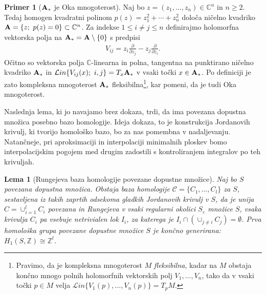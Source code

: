 \documentclass[12pt,a4paper,twoside]{article}
\theoremstyle{definition} %
\newtheorem{primer}[definicija]{Primer}
\theoremstyle{plain} %
\newtheorem{lema}[definicija]{Lema}
\numberwithin{equation}{section}  %
\begin{document}
\begin{primer} [$\textbf{\textup{A}}_{*}$ je Oka mnogoterost] \label{primer-oka}
Naj bo $z = (z_{1}, \dots , z_{n}) \in \mathbb{C}^{n}$ in $n \geq 2$. Tedaj  homogen kvadratni polinom $p(z) = z_{1}^{2} + \cdots + z_{n}^{2}$ določa ničelno kvadriko $\textbf{\textup{A}} = \{z ; \ p(z)=0 \} \subset \mathbb{C}^{n}$.
Za indekse $1 \leq i \neq j \leq n$ definirajmo holomorfna vektorska polja na $ \textbf{\textup{A}}_{*} = \textbf{\textup{A}} \setminus \{ 0 \}$ s predpisi
\begin{gather*}
V_{ij} = z_{i} \frac{\partial}{\partial z_{j}} - z_{j} \frac{\partial}{\partial z_{i}}.
\end{gather*}
Očitno so vektorska polja $\mathbb{C}$-linearna in polna, tangentna na punktirano ničelno kvadriko $\textbf{\textup{A}}_{*}$ in $\mathcal{L}in \{ V_{ij}(x) ; \ i,j \} = T_{x}\textbf{\textup{A}}_{*}$ v vsaki točki $x \in \textbf{\textup{A}}_{*}$. Po definiciji je zato kompleksna mnogoterost $\textbf{\textup{A}}_{*}$ fleksibilna\footnote{Pravimo, da je kompleksna mnogoterost $M$ \emph{fleksibilna}, kadar na $M$ obstaja končno mnogo polnih holomorfnih vektorskih polj $V_{1}, \dots , V_{n}$, tako da v vsaki točki $p \in M$ velja $\mathcal{L}in \{ V_{1}(p), \dots , V_{n}(p) \} = T_{p}M$.}, 
kar pomeni, da je tudi Oka mnogoterost.
\end{primer}

Naslednja lema, ki jo navajamo brez dokaza, trdi, da ima povezana dopustna množica posebno bazo homologije. Ideja dokaza, to je konstrukcija Jordanovih krivulj, ki tvorijo homološko bazo, bo za nas pomembna v nadaljevanju. Natančneje, pri aproksimaciji in interpolaciji minimalnih ploskev bomo interpolacijskim pogojem med drugim zadostili s kontroliranjem integralov po teh krivuljah.

\begin{lema} [Rungejeva baza homologije povezane dopustne množice] \label{lema:Runge-hom-baza}
Naj bo $S$ povezana dopustna množica. Obstaja baza homologije $\mathcal{C} = \{ C_{1}, \dots , C_{l} \}$ za $S$, sestavljena iz takih zaprtih odsekoma gladkih Jordanovih krivulj v $S$, da je unija $C = \cup_{i=1}^{l} C_{i}$ povezana in Rungejeva v vsaki regularni okolici $S_{\varepsilon}$ množice $S$, vsaka krivulja $C_{i}$ pa vsebuje netrivialen lok $I_{i}$, za katerega je $I_{i} \cap (\cup_{j \neq i} C_{j}) = \emptyset$.
Prva homološka grupa povezane dopustne množice $S$ je končno generirana: $H_{1}(S, \mathbb{Z}) \cong \mathbb{Z}^{l}$.
\end{lema}
\end{document}
